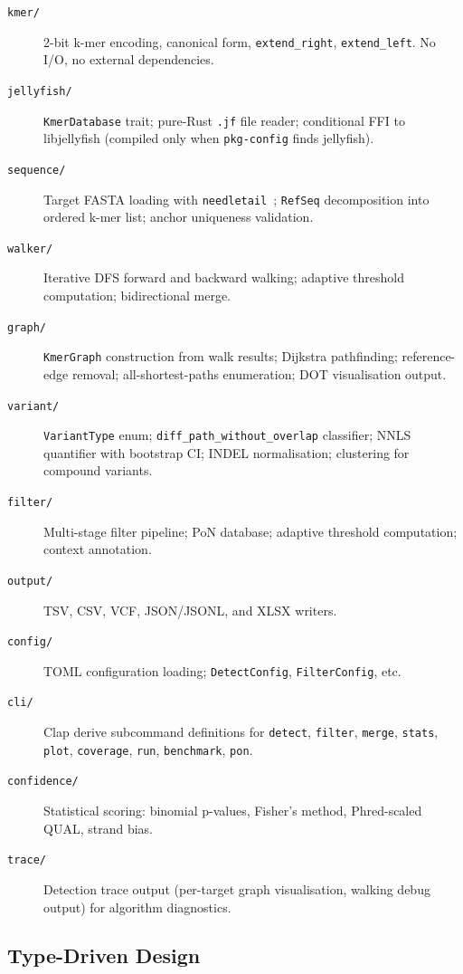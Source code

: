 \begin{description}
  \item[\texttt{kmer/}] 2-bit k-mer encoding, canonical form, \texttt{extend\_right},
    \texttt{extend\_left}.  No I/O, no external dependencies.
  \item[\texttt{jellyfish/}] \texttt{KmerDatabase} trait; pure-Rust \texttt{.jf}
    file reader; conditional FFI to libjellyfish (compiled only when
    \texttt{pkg-config} finds jellyfish).
  \item[\texttt{sequence/}] Target FASTA loading with \texttt{needletail}~\cite{needletail};
    \texttt{RefSeq} decomposition into ordered k-mer list; anchor uniqueness validation.
  \item[\texttt{walker/}] Iterative DFS forward and backward walking;
    adaptive threshold computation; bidirectional merge.
  \item[\texttt{graph/}] \texttt{KmerGraph} construction from walk results;
    Dijkstra pathfinding; reference-edge removal; all-shortest-paths enumeration;
    DOT visualisation output.
  \item[\texttt{variant/}] \texttt{VariantType} enum; \texttt{diff\_path\_without\_overlap}
    classifier; NNLS quantifier with bootstrap CI; INDEL normalisation; clustering
    for compound variants.
  \item[\texttt{filter/}] Multi-stage filter pipeline; PoN database; adaptive
    threshold computation; context annotation.
  \item[\texttt{output/}] TSV, CSV, VCF, JSON/JSONL, and XLSX writers.
  \item[\texttt{config/}] TOML configuration loading; \texttt{DetectConfig},
    \texttt{FilterConfig}, etc.
  \item[\texttt{cli/}] Clap derive subcommand definitions for \texttt{detect},
    \texttt{filter}, \texttt{merge}, \texttt{stats}, \texttt{plot},
    \texttt{coverage}, \texttt{run}, \texttt{benchmark}, \texttt{pon}.
  \item[\texttt{confidence/}] Statistical scoring: binomial p-values, Fisher's
    method, Phred-scaled QUAL, strand bias.
  \item[\texttt{trace/}] Detection trace output (per-target graph visualisation,
    walking debug output) for algorithm diagnostics.
\end{description}

\subsection{Type-Driven Design}
\label{sec:type-driven}

